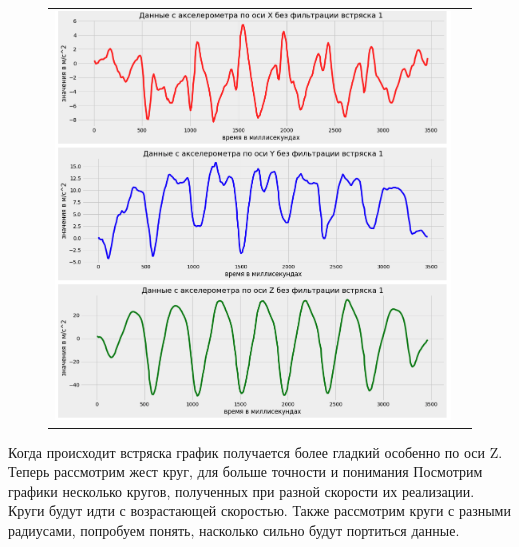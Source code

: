 \begin{figure}[H]
    \begin{center}
        \begin{tabular}{cc}
            \includegraphics[width=1\textwidth]{farim/shakeeee.png} & 
        \end{tabular}
    \end{center}
\end{figure}

Когда происходит встряска график получается более гладкий особенно по оси Z.
Теперь рассмотрим жест круг, для больше точности и понимания
Посмотрим графики несколько кругов, полученных при разной скорости их реализации.
Круги будут идти с возрастающей скоростью.
Также рассмотрим круги с разными радиусами, попробуем понять, насколько сильно будут портиться данные.

